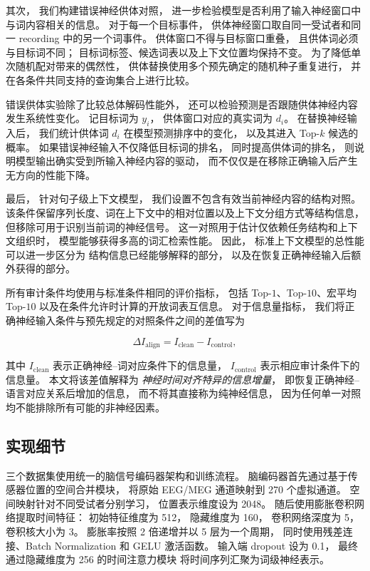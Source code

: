 其次，
我们构建错误神经供体对照，
进一步检验模型是否利用了输入神经窗口中与词内容相关的信息。
对于每一个目标事件，
供体神经窗口取自同一受试者和同一 recording 中的另一个词事件。
供体窗口不得与目标窗口重叠，
且供体词必须与目标词不同；
目标词标签、候选词表以及上下文位置均保持不变。
为了降低单次随机配对带来的偶然性，
供体替换使用多个预先确定的随机种子重复进行，
并在各条件共同支持的查询集合上进行比较。

错误供体实验除了比较总体解码性能外，
还可以检验预测是否跟随供体神经内容发生系统性变化。
记目标词为 $y_i$，
供体窗口对应的真实词为 $d_i$。
在替换神经输入后，
我们统计供体词 $d_i$ 在模型预测排序中的变化，
以及其进入 Top-$k$ 候选的概率。
如果错误神经输入不仅降低目标词的排名，
同时提高供体词的排名，
则说明模型输出确实受到所输入神经内容的驱动，
而不仅仅是在移除正确输入后产生无方向的性能下降。

最后，
针对句子级上下文模型，
我们设置不包含有效当前神经内容的结构对照。
该条件保留序列长度、词在上下文中的相对位置以及上下文分组方式等结构信息，
但移除可用于识别当前词的神经信号。
这一对照用于估计仅依赖任务结构和上下文组织时，
模型能够获得多高的词汇检索性能。
因此，
标准上下文模型的总性能可以进一步区分为
结构信息已经能够解释的部分，
以及在恢复正确神经输入后额外获得的部分。

所有审计条件均使用与标准条件相同的评价指标，
包括 Top-$1$、Top-$10$、宏平均 Top-$10$
以及在条件允许时计算的开放词表互信息。
对于信息量指标，
我们将正确神经输入条件与预先规定的对照条件之间的差值写为

\[
\Delta I_{\mathrm{align}}
=
I_{\mathrm{clean}}
-
I_{\mathrm{control}},
\]

其中 $I_{\mathrm{clean}}$ 表示正确神经--词对应条件下的信息量，
$I_{\mathrm{control}}$ 表示相应审计条件下的信息量。
本文将该差值解释为
\emph{神经时间对齐特异的信息增量}，
即恢复正确神经--语言对应关系后增加的信息，
而不将其直接称为纯神经信息，
因为任何单一对照均不能排除所有可能的非神经因素。

\subsection{实现细节}

三个数据集使用统一的脑信号编码器架构和训练流程。
脑编码器首先通过基于传感器位置的空间合并模块，
将原始 EEG/MEG 通道映射到 270 个虚拟通道。
空间映射针对不同受试者分别学习，
位置表示维度设为 2048。
随后使用膨胀卷积网络提取时间特征：
初始特征维度为 512，
隐藏维度为 160，
卷积网络深度为 5，
卷积核大小为 3。
膨胀率按照 2 倍递增并以 5 层为一个周期，
同时使用残差连接、Batch Normalization 和 GELU 激活函数。
输入端 dropout 设为 0.1，
最终通过隐藏维度为 256 的时间注意力模块
将时间序列汇聚为词级神经表示。

